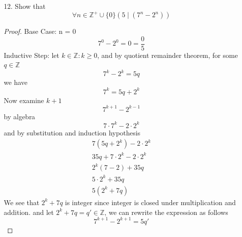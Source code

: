 \documentclass[12pt]{article}
\newcommand{\Z}{\mathbb{Z}}
\newcommand{\paren}[1]{\left( #1 \right)}
\newcommand{\nonneg}{\Z^+ \cup \{0\}}
\begin{document}
\begin{enumerate}
\begin{enumerate}
\begin{enumerate}[a.]
                        \item[12.] Show that
                            \[
                            \forall n \in \nonneg \paren{5 \mid \paren{7^n - 2^n}}
                            \]
                            \begin{proof}
                                Base Case: n = 0
                                \[
                                7^0 - 2^0 = 0 = \frac{0}{5} 
                                \]
                                Inductive Step: let $k \in \Z : k \geq 0$, and by quotient remainder theorem, for some $q \in \Z$
                                \[
                                7^k - 2^k =5q
                                \]
                                we have
                                \[
                                7^k = 5q + 2^k
                                \]
                                Now examine $k+1$
                                \[
                                7^{k+1}-2^{k-1}
                                \]
                                by algebra 
                                \[
                                7\cdot 7^k - 2\cdot 2^k 
                                \]
                                and by substitution and induction hypothesis
                                \begin{align*}
                                    7\paren{5q + 2^k} - 2\cdot 2^k \\
                                    35q + 7\cdot 2^k - 2\cdot 2^k \\
                                    2^k\paren{7-2}+35q \\
                                    5\cdot 2^k + 35q \\
                                    5\paren{2^k + 7q} 
                                \end{align*}
                                We see that $2^k + 7q$ is integer since integer is closed under multiplication and addition. and let $2^k + 7q = q' \in \Z$, we can rewrite the expression as follows
                                \[
                                7^{k+1} - 2^{k+1} = 5q'
                                \]
                                
                            \end{proof}


\end{enumerate}
\end{enumerate}
\end{enumerate}
\end{document}
